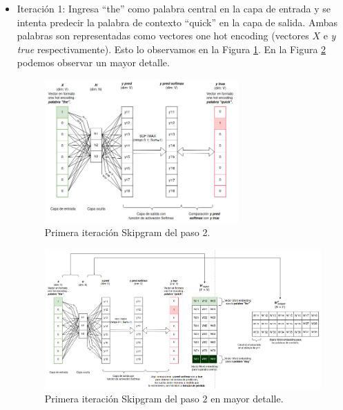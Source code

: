 \documentclass[12pt,a4paper]{article}
\begin{document}
\begin{sloppypar}
\begin{enumerate}
\begin{itemize}
      \item Iteración 1: Ingresa “the” como palabra central en la capa de entrada y se intenta predecir la palabra de contexto “quick” en la capa de salida. Ambas palabras son representadas como vectores one hot encoding (vectores $X$ e \textit{y true} respectivamente). Esto lo observamos en la Figura \ref{fig:5_EjSkip}. En la Figura \ref{fig:6_EjSkip} podemos observar un mayor detalle. 

\begin{figure}[H]    %
\centering
\includegraphics[width=0.7\textwidth]{images/Ejemplo_Skipgram/5_EjSkip.png}
\caption{Primera iteración Skipgram del paso 2.} 
\label{fig:5_EjSkip}
\end{figure}

\begin{figure}[H]    %
\centering
\includegraphics[width=1\textwidth]{images/Ejemplo_Skipgram/6_EjSkip.png}
 \captionsetup{justification=centering,margin=3.5cm}
\caption{Primera iteración Skipgram del paso 2 en mayor detalle.} 
\label{fig:6_EjSkip}
\end{figure}


\end{itemize}
\end{enumerate}
\end{sloppypar}
\end{document}

